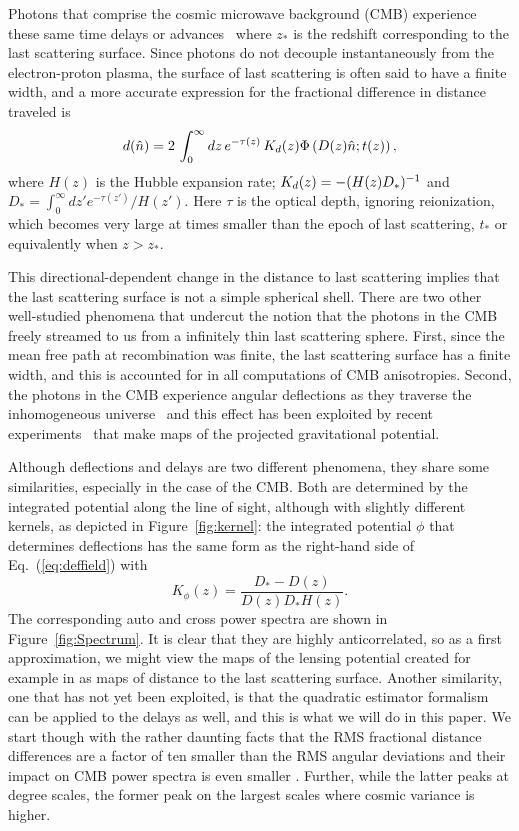 \documentclass[prd,amsmath,amssymb,floatfix,superscriptaddress,nofootinbib,twocolumn]{revtex4-1}
\def\be{\begin{equation}}
\def\ee{\end{equation}}
\newcommand{\ec}[1]{Eq.~(\ref{eq:#1})}
\newcommand{\eql}[1]{\label{eq:#1}}
\newcommand{\rf}[1]{\ref{fig:#1}}
\newcommand{\wh}[1]{{\color{red} #1}}
\begin{document}
Photons that comprise the cosmic microwave background (CMB) experience these same time delays or advances~\cite{Hu:2001yq} where $z_*$ is the redshift corresponding to the last scattering surface. Since photons do not decouple instantaneously from the electron-proton plasma, the surface of last scattering is often said to have a finite width, and a more accurate expression for the fractional difference in distance traveled is
\be
\fd(\hat n) = 2\, \int_0^{\infty} dz \, e^{-\tau(z)}\, K_\fd(z)\Phi\left(D(z)\hat n; t(z)\right) ,
\eql{deffield}
\ee
where $H(z)$ is the Hubble expansion rate; $K_d(z) =  -(H(z)D_*)^{-1}$ and $D_* =  \int_0^\infty dz' e^{-\tau(z') }/H(z')$.  Here 
 $\tau$ is the optical depth, ignoring reionization, which becomes very large at times smaller than the epoch of  last scattering, $t_*$ or equivalently when $z>z_*$.

This directional-dependent change in the distance to last scattering implies that the last scattering surface is not a simple spherical shell. There are two other well-studied phenomena that undercut the notion that the photons in the CMB freely streamed to us from a infinitely thin last scattering sphere. First, since the mean free path at recombination was finite, the last scattering surface has a finite width, and this is accounted for in all computations of CMB anisotropies. Second, the photons in the CMB experience angular deflections as they traverse the inhomogeneous universe~\cite{Hu:2001tn,Lewis:2006fu} and this effect has been exploited by recent experiments~\cite{Smith:2007rg,Ade:2013tyw,Story:2014hni,Sherwin:2016tyf,Aghanim:2018oex} that make maps of the projected gravitational potential.

Although deflections and delays are two different phenomena, they share some similarities, especially in the case of the CMB. Both are determined by the integrated potential along the line of sight, although with slightly different kernels, as depicted in Figure~\rf{kernel}: the integrated potential $\phi$ that determines deflections has the same form as the right-hand side of \ec{deffield}  with
\be
K_\phi(z) = \frac{D_*-D(z)}{ D(z) D_* H(z)} .
\ee
The corresponding auto and cross power spectra are shown in Figure~\rf{Spectrum}.
It is clear that they are highly \wh{anti}correlated, so as a first approximation, we might view the maps of the lensing potential created for example in \citet{Aghanim:2018oex} as  maps of distance to the last scattering surface. Another similarity, one that has not yet been exploited, is that the quadratic estimator formalism  \cite{Hu:2001tn} can be applied to the delays as well, and this is what we will do in this paper.  We start though with the rather daunting facts that the RMS fractional distance differences are a factor of ten smaller than the RMS angular deviations 
 and their impact on CMB power spectra is even smaller \cite{Hu:2001yq}. Further, while the latter peaks at degree scales, the former peak on the largest scales where cosmic variance is
 higher.  
\end{document}
